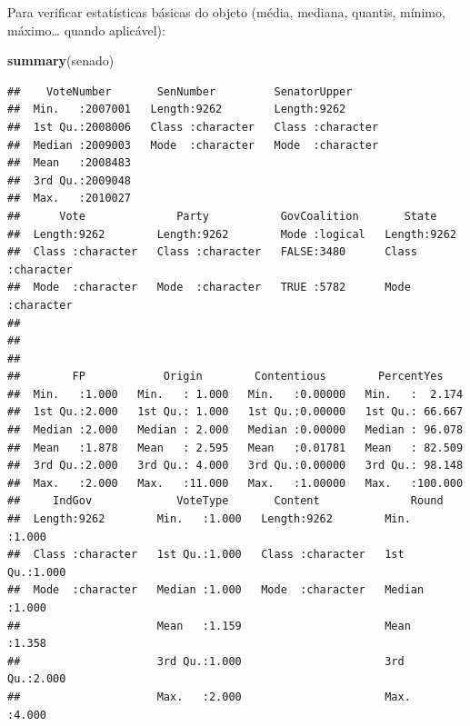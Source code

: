 \documentclass[]{book}
\newenvironment{Shaded}{\begin{snugshade}}{\end{snugshade}}
\newcommand{\KeywordTok}[1]{\textcolor[rgb]{0.13,0.29,0.53}{\textbf{#1}}}
\newcommand{\NormalTok}[1]{#1}
\begin{document}
Para verificar estatísticas básicas do objeto (média, mediana, quantis,
mínimo, máximo\ldots{} quando aplicável):

\begin{Shaded}
\begin{Highlighting}[]
\KeywordTok{summary}\NormalTok{(senado)}
\end{Highlighting}
\end{Shaded}

\begin{verbatim}
##    VoteNumber       SenNumber         SenatorUpper      
##  Min.   :2007001   Length:9262        Length:9262       
##  1st Qu.:2008006   Class :character   Class :character  
##  Median :2009003   Mode  :character   Mode  :character  
##  Mean   :2008483                                        
##  3rd Qu.:2009048                                        
##  Max.   :2010027                                        
##      Vote              Party           GovCoalition       State          
##  Length:9262        Length:9262        Mode :logical   Length:9262       
##  Class :character   Class :character   FALSE:3480      Class :character  
##  Mode  :character   Mode  :character   TRUE :5782      Mode  :character  
##                                                                          
##                                                                          
##                                                                          
##        FP            Origin        Contentious        PercentYes     
##  Min.   :1.000   Min.   : 1.000   Min.   :0.00000   Min.   :  2.174  
##  1st Qu.:2.000   1st Qu.: 1.000   1st Qu.:0.00000   1st Qu.: 66.667  
##  Median :2.000   Median : 2.000   Median :0.00000   Median : 96.078  
##  Mean   :1.878   Mean   : 2.595   Mean   :0.01781   Mean   : 82.509  
##  3rd Qu.:2.000   3rd Qu.: 4.000   3rd Qu.:0.00000   3rd Qu.: 98.148  
##  Max.   :2.000   Max.   :11.000   Max.   :1.00000   Max.   :100.000  
##     IndGov             VoteType       Content              Round      
##  Length:9262        Min.   :1.000   Length:9262        Min.   :1.000  
##  Class :character   1st Qu.:1.000   Class :character   1st Qu.:1.000  
##  Mode  :character   Median :1.000   Mode  :character   Median :1.000  
##                     Mean   :1.159                      Mean   :1.358  
##                     3rd Qu.:1.000                      3rd Qu.:2.000  
##                     Max.   :2.000                      Max.   :4.000
\end{verbatim}
\end{document}
